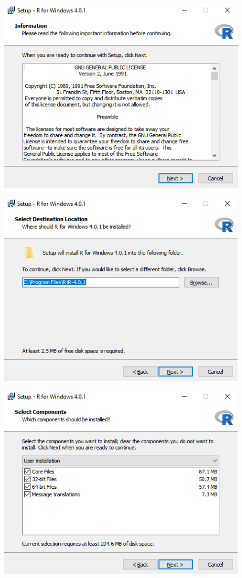 \documentclass[
]{book}
\begin{document}
\includegraphics{images/05-r_5.png}

\includegraphics{images/05-r_6.png}

\includegraphics{images/05-r_7.png}
\end{document}
